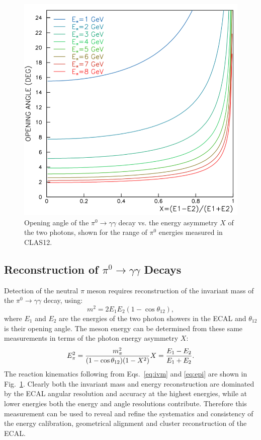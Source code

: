 \begin{figure}[t]
\centering
\includegraphics[width=0.7\columnwidth,keepaspectratio]{img/opa.png}
\caption[]{Opening angle of the $\pi^0 \rightarrow \gamma \gamma$ decay vs. the energy asymmetry $X$ of
  the two photons, shown for the range of $\pi^0$ energies measured in CLAS12.}
\label{fig:opa}
\end{figure}

\subsection{Reconstruction of $\pi^0\rightarrow \gamma \gamma$ Decays}

Detection of the neutral $\pi$ meson requires reconstruction of the invariant mass of the
$\pi^0 \rightarrow \gamma \gamma$ decay, using:
\begin{equation}
m^2 = 2 E_1 E_2 (1-\cos \theta_{12}),
\label{eq:ivm}
\end{equation}
where $E_1$ and $E_2$ are the energies of the two photon showers in the ECAL and $\theta_{12}$ is their opening
angle. The meson energy can be determined from these same measurements in
terms of the photon energy asymmetry $X$:
\begin{equation}
E^2_{\pi} = \frac{m^2_{\pi}}{(1-\cos \theta_{12})(1-X^2)}  \\
X=\frac{E_1-E_2}{E_1+E_2}.
\label{eq:epi}
\end{equation}
The reaction kinematics following from Eqs.~\ref{eq:ivm} and \ref{eq:epi} are shown in Fig.~\ref{fig:opa}. Clearly
both the invariant mass and energy reconstruction are dominated by the ECAL angular resolution and accuracy
at the highest energies, while at lower energies both the energy and angle resolutions contribute. Therefore this
measurement can be used to reveal and refine the systematics and consistency of the energy calibration, geometrical
alignment and cluster reconstruction of the ECAL.

